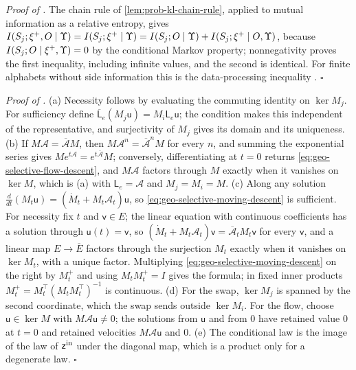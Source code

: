 \noindent\emph{Proof of .}
The chain rule of \cref{lem:prob-kl-chain-rule}, applied to mutual information
as a relative entropy, gives
\(I(S_j;\xi^+,O\mid\Upsilon)=I(S_j;\xi^+\mid\Upsilon)
=I(S_j;O\mid\Upsilon)+I(S_j;\xi^+\mid O,\Upsilon)\), because
\(I(S_j;O\mid\xi^+,\Upsilon)=0\) by the conditional Markov property;
nonnegativity proves the first inequality, including infinite values, and the
second is identical. For finite alphabets without side information this is the
data-processing inequality \citep[Section 2.8, Theorem 2.8.1]{CoverThomas2006}.
\(\square\)

\noindent\emph{Proof of .}
(a) Necessity follows by evaluating the commuting identity on \(\ker M_j\). For
sufficiency define \(\overline{\mathsf L}_e(M_j\mathsf u)=M_i\mathsf L_e\mathsf u\);
the condition makes this independent of the representative, and surjectivity
of \(M_j\) gives its domain and its uniqueness. (b) If
\(M\mathcal A=\overline{\mathcal A}M\), then
\(M\mathcal A^n=\overline{\mathcal A}^nM\) for every \(n\), and summing the
exponential series gives \(Me^{t\mathcal A}=e^{t\overline{\mathcal A}}M\);
conversely, differentiating at \(t=0\) returns
\eqref{eq:geo-selective-flow-descent}, and \(M\mathcal A\) factors through
\(M\) exactly when it vanishes on \(\ker M\), which is (a) with
\(\mathsf L_e=\mathcal A\) and \(M_j=M_i=M\). (c) Along any solution
\(\tfrac{d}{dt}(M_t\mathsf u)=(\dot M_t+M_t\mathcal A_t)\mathsf u\), so
\eqref{eq:geo-selective-moving-descent} is sufficient. For necessity fix \(t\)
and \(\mathsf v\in E\); the linear equation with continuous coefficients has a
solution through \(\mathsf u(t)=\mathsf v\), so
\((\dot M_t+M_t\mathcal A_t)\mathsf v=\overline{\mathcal A}_tM_t\mathsf v\) for
every \(\mathsf v\), and a linear map \(E\to\overline E\) factors through the
surjection \(M_t\) exactly when it vanishes on \(\ker M_t\), with a unique
factor. Multiplying \eqref{eq:geo-selective-moving-descent} on the right by
\(M_t^+\) and using \(M_tM_t^+=I\) gives the formula; in fixed inner products
\(M_t^+=M_t^\top(M_tM_t^\top)^{-1}\) is continuous. (d) For the swap,
\(\ker M_j\) is spanned by the second coordinate, which the swap sends outside
\(\ker M_i\). For the flow, choose \(\mathsf u\in\ker M\) with
\(M\mathcal A\mathsf u\ne0\); the solutions from \(\mathsf u\) and from \(0\)
have retained value \(0\) at \(t=0\) and retained velocities
\(M\mathcal A\mathsf u\) and \(0\). (e) The conditional law is the image of the
law of \(\mathsf z^{\rm in}\) under the diagonal map, which is a product only
for a degenerate law. \(\square\)
